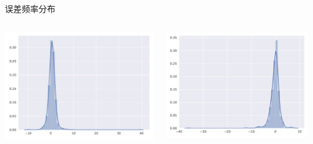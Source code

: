 \documentclass[12pt,aspectratio=169]{beamer}
\begin{document}
	\begin{frame}{误差频率分布}
		
		
		\begin{columns}
			\begin{column}{0.33\textwidth}
				\includegraphics[width=\columnwidth]{picture/x_hist}
			\end{column}
			
			\begin{column}{0.33\textwidth}
				\includegraphics[width=\columnwidth]{picture/y_hist}
			\end{column}
			

\end{columns}
\end{frame}
\end{document}
